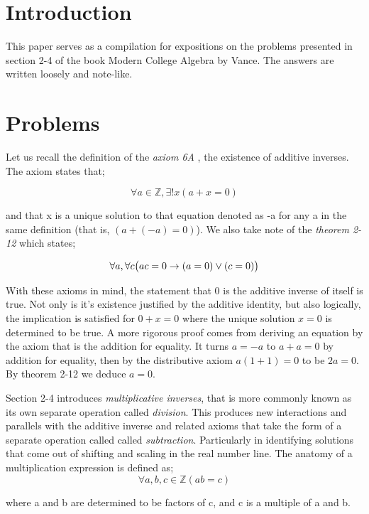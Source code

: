 \documentclass{article}
\newcommand{\paren}[1]{\mathopen{}\left( {#1}_{{}_{}}\,\negthickspace\right)\mathclose{}} %
\begin{document}
\section{Introduction}

This paper serves as a compilation for expositions on the problems presented in section
2-4 of the book Modern College Algebra by Vance. The answers are written loosely 
and note-like.

\section{Problems}

Let us recall the definition of the \emph{axiom 6A} , the existence of additive 
inverses. The axiom states that;

\[
    \forall a \in \mathbb{Z}, \exists !x \left( a + x = 0\right)
\]

and that x is a unique solution to that equation denoted as -a for any a in the
 same definition (that is, \(\left(a + (-a) = 0\right)\)). We also take note of the \emph{theorem 2-12} which states; 

\[
    \forall a, \forall c \paren{ ac =  0 \to (a= 0 )\lor(c = 0)}
\] 

With these axioms in mind, the statement that 0 is the additive inverse of itself is 
true. Not only is it's existence justified by the additive identity, but also 
logically, the implication is satisfied for \(0 + x = 0\) where the unique 
solution \(x = 0\) is determined to be true. A more rigorous proof comes from 
deriving an equation by the axiom that is the addition for equality. It turns 
\(a = -a\) to \(a +a = 0\) by addition for equality, then by the distributive 
axiom \(a(1 + 1)  =0\) to be \(2a = 0\). By theorem 2-12 we deduce \(a = 0\).

Section 2-4 introduces \emph{multiplicative inverses}, that is more commonly known as its
own separate operation called \emph{division}. This produces new interactions and parallels
with the additive inverse and related axioms that take the form of a separate operation called 
called \emph{subtraction}. Particularly in identifying solutions that come out of shifting and
scaling in the real number line. The anatomy of a multiplication expression is defined as;
\[
    \forall a, b, c \in \mathbb{Z} \left(ab = c \right)
\]
\begin{center}
    where a and b are determined to be factors of c, and c is a multiple of a and b.
\end{center}
\end{document}

